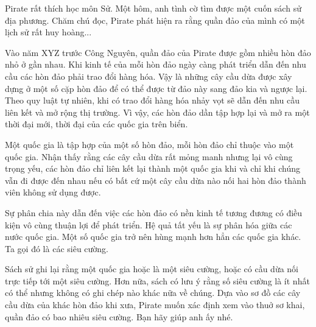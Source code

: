 Pirate rất thích học môn Sử. Một hôm, anh tình cờ tìm được một cuốn sách sử địa phương. Chăm chú đọc, Pirate phát hiện ra rằng quần đảo của mình có một lịch sử rất huy hoàng...  

   Vào năm XYZ trước Công Nguyên, quần đảo của Pirate được gồm nhiều hòn đảo nhỏ ở gần nhau. Khi kinh tế của mỗi hòn đảo ngày càng phát triển dẫn đến nhu cầu các hòn đảo phải trao đổi hàng hóa. Vậy là những cây cầu dừa được xây dựng ở một số cặp hòn đảo để có thể được từ đảo này sang đảo kia và ngược lại. Theo quy luật tự nhiên, khi có trao đổi hàng hóa nhảy vọt sẽ dẫn đến nhu cầu liên kết và mở rộng thị trường. Vì vậy, các hòn đảo dần tập hợp lại và mở ra một thời đại mới, thời đại của các quốc gia trên biển.  

   Một quốc gia là tập hợp của một số hòn đảo, mỗi hòn đảo chỉ thuộc vào một quốc gia. Nhận thấy rằng các cây cầu dừa rất mỏng manh nhưng lại vô cùng trọng yếu, các hòn đảo chỉ liên kết lại thành một quốc gia khi và chỉ khi chúng vẫn đi được đến nhau nếu có bất cứ một cây cầu dừa nào nối hai hòn đảo thành viên không sử dụng được.  

   Sự phân chia này dẫn đến việc các hòn đảo có nền kinh tế tương đương có điều kiện vô cùng thuận lợi để phát triển. Hệ quả tất yếu là sự phân hóa giữa các nước quốc gia. Một số quốc gia trở nên hùng mạnh hơn hẳn các quốc gia khác. Ta gọi đó là các siêu cường.  

   Sách sử ghi lại rằng một quốc gia hoặc là một siêu cường, hoặc có cầu dừa nối trực tiếp tới một siêu cường. Hơn nữa, sách có lưu ý rằng số siêu cường là ít nhất có thể nhưng không có ghi chép nào khác nữa về chúng. Dựa vào sơ đồ các cây cầu dừa của khác hòn đảo khi xưa, Pirate muốn xác định xem vào thuở sơ khai, quần đảo có bao nhiêu siêu cường. Bạn hãy giúp anh ấy nhé.